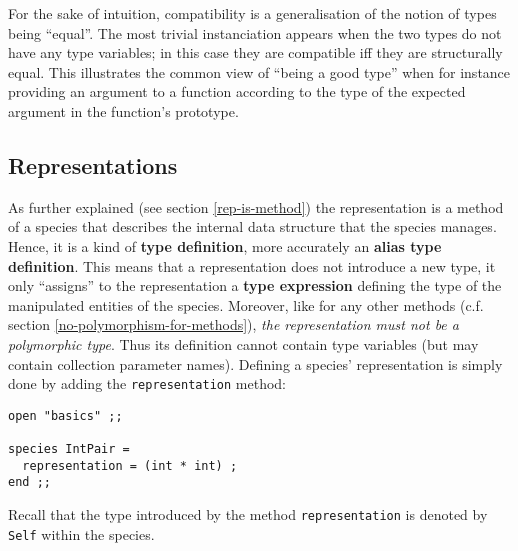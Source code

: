 \medskip
For the sake of intuition, compatibility is a generalisation of
the notion of types being ``equal''. The most trivial instanciation
appears when the two types do not have any type variables; in
this case they are compatible iff they are structurally equal. This
illustrates the common view of ``being a good type'' when for
instance providing an argument to a function according to the type of
the expected argument in the function's prototype.


\subsection{Representations}\label{representation-type}
As further explained (see section \ref{rep-is-method}) the
representation is a method of a species that describes the internal
data structure that the species manages. Hence, it is a kind of {\bf
  type definition}, more accurately an {\bf alias type
  definition}. This means that a representation does not introduce a
new type, it only ``assigns'' to the representation a {\bf type
  expression} defining the type of the manipulated entities of the
species. Moreover, like for any other methods (c.f. section
\ref{no-polymorphism-for-methods}), {\em the representation must not
  be a polymorphic type}. Thus its definition cannot
contain type variables (but may contain collection parameter
names). Defining a species' representation is simply done by adding the
{\tt representation} method:
 {\scriptsize
\begin{lstlisting}
open "basics" ;;

species IntPair =
  representation = (int * int) ;
end ;;
\end{lstlisting}
}

Recall that the type introduced by the method {\tt representation} is
denoted by {\tt Self} within the species.

\vspace{0.2cm}
\begin{syn}
 \is {} 
\end{syn}

